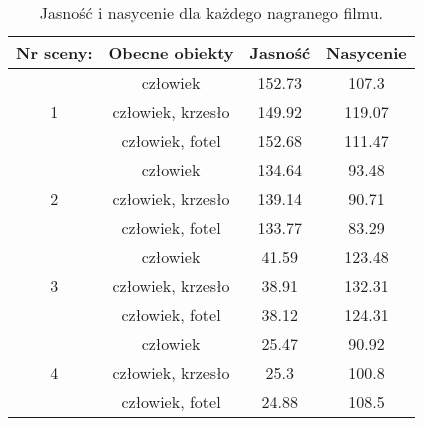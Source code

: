 
\begin{table}[H]
\centering
\caption{Jasność i nasycenie dla każdego nagranego filmu.}
\begin{tabular}{|c|c|c|c|}
\hline
Nr sceny:          & Obecne obiekty    & Jasność & Nasycenie \\ \hline
\multirow{3}{*}{1} & człowiek          & 152.73  & 107.3     \\ \cline{2-4} 
                   & człowiek, krzesło & 149.92  & 119.07    \\ \cline{2-4} 
                   & człowiek, fotel   & 152.68  & 111.47    \\ \hline
\multirow{3}{*}{2} & człowiek          & 134.64  & 93.48     \\ \cline{2-4} 
                   & człowiek, krzesło & 139.14  & 90.71     \\ \cline{2-4} 
                   & człowiek, fotel   & 133.77  & 83.29     \\ \hline
\multirow{3}{*}{3} & człowiek          & 41.59   & 123.48    \\ \cline{2-4} 
                   & człowiek, krzesło & 38.91   & 132.31    \\ \cline{2-4} 
                   & człowiek, fotel   & 38.12   & 124.31    \\ \hline
\multirow{3}{*}{4} & człowiek          & 25.47   & 90.92     \\ \cline{2-4} 
                   & człowiek, krzesło & 25.3    & 100.8     \\ \cline{2-4} 
                   & człowiek, fotel   & 24.88   & 108.5     \\ \hline
\end{tabular}
\label{tab:saturation-value-table}
\end{table}